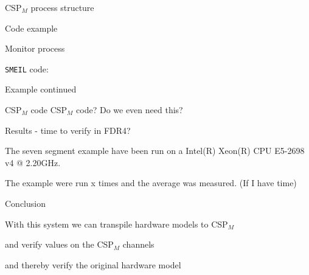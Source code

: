 \documentclass[13pt]{beamer}
\newcommand{\cspm}{CSP$_M$}
\begin{document}
%
\begin{frame}{\cspm{} process structure}
 \begin{block}{}
   Code example
 \end{block}

\end{frame}
%
\begin{frame}{Monitor process}
 \begin{block}{}
   \texttt{SMEIL} code:
     \vspace{5mm}

      \scalebox{0.6}{\usebox{\smeilexamplecodey}}


 \end{block}

\end{frame}
%
\begin{frame}{Example continued}
 \begin{block}{\cspm{} code}
  \cspm{} code?
  Do we even need this?
 \end{block}
\end{frame}
%
\begin{frame}{Results - time to verify in FDR4?}
 \begin{block}{}
     The seven segment example have been run on a Intel(R) Xeon(R) CPU E5-2698 v4 @ 2.20GHz.

     \vspace{5mm}

   The example were run x times and the average was measured. (If I have time)
 \end{block}
\end{frame}
%
\begin{frame}{Conclusion}
 \begin{block}{}
  With this system we can transpile hardware models to \cspm{}
 \end{block}

 \pause

 \begin{block}{}
  and verify values on the \cspm{} channels
 \end{block}

 \pause

 \begin{block}{}
  and thereby verify the original hardware model
 \end{block}

\end{frame}
\end{document}
